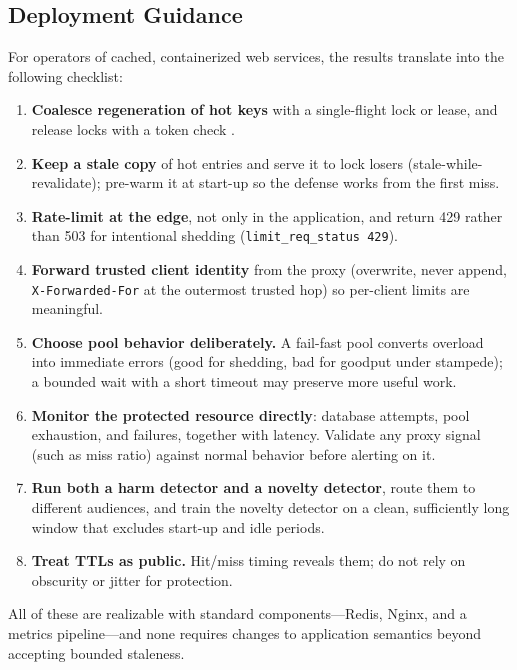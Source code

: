\documentclass[preprint,12pt]{elsarticle}
\begin{document}
\subsection{Deployment Guidance}
For operators of cached, containerized web services, the results translate into the
following checklist:
\begin{enumerate}[leftmargin=*]
\item \textbf{Coalesce regeneration of hot keys} with a single-flight lock or lease,
and release locks with a token check \cite{kleppmann2016}.
\item \textbf{Keep a stale copy} of hot entries and serve it to lock losers
(stale-while-revalidate); pre-warm it at start-up so the defense works from the first
miss.
\item \textbf{Rate-limit at the edge}, not only in the application, and return 429
rather than 503 for intentional shedding (\texttt{limit\_req\_status 429}).
\item \textbf{Forward trusted client identity} from the proxy (overwrite, never
append, \texttt{X-Forwarded-For} at the outermost trusted hop) so per-client limits are
meaningful.
\item \textbf{Choose pool behavior deliberately.} A fail-fast pool converts overload
into immediate errors (good for shedding, bad for goodput under stampede); a bounded
wait with a short timeout may preserve more useful work.
\item \textbf{Monitor the protected resource directly}: database attempts, pool
exhaustion, and failures, together with latency. Validate any proxy signal (such as
miss ratio) against normal behavior before alerting on it.
\item \textbf{Run both a harm detector and a novelty detector}, route them to
different audiences, and train the novelty detector on a clean, sufficiently long
window that excludes start-up and idle periods.
\item \textbf{Treat TTLs as public.} Hit/miss timing reveals them; do not rely on
obscurity or jitter for protection.
\end{enumerate}
All of these are realizable with standard components---Redis, Nginx, and a metrics
pipeline---and none requires changes to application semantics beyond accepting bounded
staleness.
\end{document}
